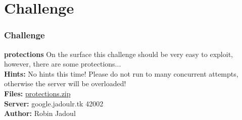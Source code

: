 \documentclass[aspectratio=169]{beamer}
\begin{document}
\section{Challenge}

\begin{frame}[fragile]
    \frametitle{Challenge}
    {
        \begin{alertblock}{\textbf{protections}}
            On the surface this challenge should be very easy to exploit, however, there are some protections...\\
            \textbf{Hints:} No hints this time! Please do not run to many concurrent attempts, otherwise the server will be overloaded!\\
            \textbf{Files:} \href{https://flagbot.ch/protections.zip}{protections.zip}\\
            \textbf{Server:} google.jadoulr.tk 42002\\
            \textbf{Author:} Robin Jadoul
        \end{alertblock}
    }
\end{frame}
\end{document}
